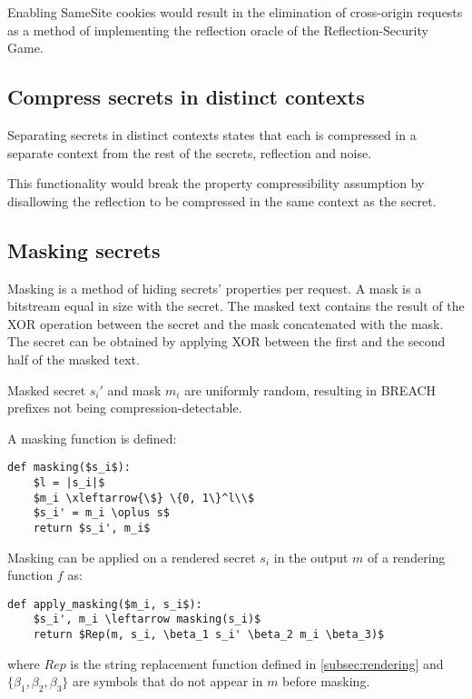\documentclass{sig-alternate-05-2015}
\begin{document}
Enabling SameSite cookies would result in the elimination of cross-origin
requests as a method of implementing the reflection oracle of the
Reflection-Security Game.

\subsection{Compress secrets in distinct contexts}\label{subsec:contexts}
Separating secrets in distinct contexts states that each is compressed
in a separate context from the rest of the secrets, reflection and noise.

This functionality would break the property compressibility assumption by
disallowing the reflection to be compressed in the same context as the secret.

\subsection{Masking secrets}\label{subsec:masking}
Masking is a method of hiding secrets' properties per request. A mask is a
bitstream equal in size with the secret. The masked text contains the result of
the XOR operation between the secret and the mask concatenated with the mask.
The secret can be obtained by applying XOR between the first and the second
half of the masked text.

Masked secret $s_i'$ and mask $m_i$ are uniformly random, resulting in BREACH
prefixes not being compression-detectable.

A masking function is defined:

\begin{lstlisting}[texcl,mathescape]
def masking($s_i$):
    $l = |s_i|$
    $m_i \xleftarrow{\$} \{0, 1\}^l\\$
    $s_i' = m_i \oplus s$
    return $s_i', m_i$
\end{lstlisting}

Masking can be applied on a rendered secret $s_i$ in the output $m$ of a
rendering function $f$ as:

\begin{lstlisting}[texcl,mathescape]
def apply_masking($m_i, s_i$):
    $s_i', m_i \leftarrow masking(s_i)$
    return $Rep(m, s_i, \beta_1 s_i' \beta_2 m_i \beta_3)$
\end{lstlisting}

where $Rep$ is the string replacement function defined in
\ref{subsec:rendering} and $\{\beta_1, \beta_2, \beta_3\}$ are symbols that do not
appear in $m$ before masking.
\end{document}
